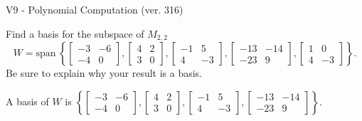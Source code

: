 \begin{exercise}
  \begin{exerciseTitle}V9 - Polynomial Computation (ver. 316)\end{exerciseTitle}
  \begin{exerciseStatement}
    Find a basis for the subspace of \(M_{2,2}\) 
\[W=\mathrm{span}\ \left\{\left[\begin{array}{cc}
-3 & -6 \\
-4 & 0
\end{array}\right] , \left[\begin{array}{cc}
4 & 2 \\
3 & 0
\end{array}\right] , \left[\begin{array}{cc}
-1 & 5 \\
4 & -3
\end{array}\right] , \left[\begin{array}{cc}
-13 & -14 \\
-23 & 9
\end{array}\right] , \left[\begin{array}{cc}
1 & 0 \\
4 & -3
\end{array}\right]\right\}.\]
 Be sure to explain why your result is a basis.


  \end{exerciseStatement}
  \begin{exerciseAnswer}
   A basis of \(W\) is  \(\left\{\left[\begin{array}{cc}
-3 & -6 \\
-4 & 0
\end{array}\right] , \left[\begin{array}{cc}
4 & 2 \\
3 & 0
\end{array}\right] , \left[\begin{array}{cc}
-1 & 5 \\
4 & -3
\end{array}\right] , \left[\begin{array}{cc}
-13 & -14 \\
-23 & 9
\end{array}\right]\right\}\).
  


  \end{exerciseAnswer}
\end{exercise}